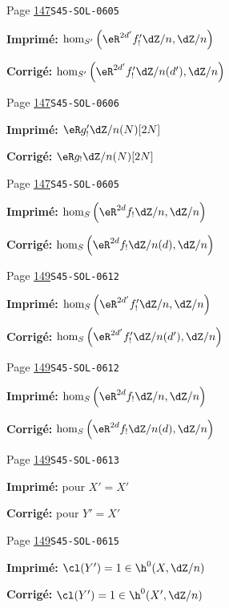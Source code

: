 \begin{description}
\smallskip
\item[\hypertarget{apparatus:FR-0109}{109}] Page \hyperlink{printpage:fr:147}{147}\quad\texttt{S45-SOL-0605}
\par\noindent\textbf{Imprimé:} \(\hom_{S'}\left(\eR^{2 d'} f_!' \dZ/n,\dZ/n\right)\)
\par\noindent\textbf{Corrigé:} \(\hom_{S'}\left(\eR^{2 d'} f_!' \dZ/n(d'),\dZ/n\right)\)
\smallskip
\item[\hypertarget{apparatus:FR-0110}{110}] Page \hyperlink{printpage:fr:147}{147}\quad\texttt{S45-SOL-0606}
\par\noindent\textbf{Imprimé:} \(\eR g_!'\dZ/n(N)[2 N]\)
\par\noindent\textbf{Corrigé:} \(\eR g_!\dZ/n(N)[2 N]\)
\smallskip
\item[\hypertarget{apparatus:FR-0111}{111}] Page \hyperlink{printpage:fr:147}{147}\quad\texttt{S45-SOL-0605}
\par\noindent\textbf{Imprimé:} \(\hom_S\left(\eR^{2 d} f_!\dZ/n,\dZ/n\right)\)
\par\noindent\textbf{Corrigé:} \(\hom_S\left(\eR^{2 d} f_!\dZ/n(d),\dZ/n\right)\)
\smallskip
\item[\hypertarget{apparatus:FR-0112}{112}] Page \hyperlink{printpage:fr:149}{149}\quad\texttt{S45-SOL-0612}
\par\noindent\textbf{Imprimé:} \(\hom_S\left(\eR^{2 d'} f_!' \dZ/n,\dZ/n\right)\)
\par\noindent\textbf{Corrigé:} \(\hom_S\left(\eR^{2 d'} f_!' \dZ/n(d'),\dZ/n\right)\)
\smallskip
\item[\hypertarget{apparatus:FR-0113}{113}] Page \hyperlink{printpage:fr:149}{149}\quad\texttt{S45-SOL-0612}
\par\noindent\textbf{Imprimé:} \(\hom_S\left(\eR^{2 d}f_!\dZ/n,\dZ/n\right)\)
\par\noindent\textbf{Corrigé:} \(\hom_S\left(\eR^{2 d}f_!\dZ/n(d),\dZ/n\right)\)
\smallskip
\item[\hypertarget{apparatus:FR-0114}{114}] Page \hyperlink{printpage:fr:149}{149}\quad\texttt{S45-SOL-0613}
\par\noindent\textbf{Imprimé:} pour $X'=X'$
\par\noindent\textbf{Corrigé:} pour $Y'=X'$
\smallskip
\item[\hypertarget{apparatus:FR-0115}{115}] Page \hyperlink{printpage:fr:149}{149}\quad\texttt{S45-SOL-0615}
\par\noindent\textbf{Imprimé:} \(\cl(Y')=1\in \h^0(X,\dZ/n)\)
\par\noindent\textbf{Corrigé:} \(\cl(Y')=1\in \h^0(X',\dZ/n)\)

\end{description}
